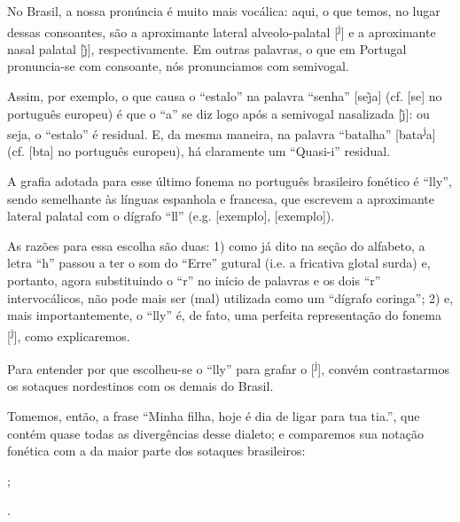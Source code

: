 \documentclass[12pt, a5paper, titlepage]{article}
\begin{document}
\begin{bilingualpages}
    No Brasil, a nossa pronúncia é muito mais vocálica: aqui, o que temos, no lugar dessas consoantes, são a aproximante lateral alveolo-palatal [\textsuperscript{j}] e a aproximante nasal palatal [\~\j], respectivamente. Em outras palavras, o que em Portugal pronuncia-se com consoante, nós pronunciamos com semivogal.

    Assim, por exemplo, o que causa o ``estalo'' na palavra ``senha'' [\textprimstress se\~\j a] (cf. [\textprimstress se\textltailn\textturna] no português europeu) é que o ``a'' se diz logo após a semivogal nasalizada [\~\j]: ou seja, o ``estalo'' é residual. E, da mesma maneira, na palavra ``batalha'' [ba\textprimstress ta{\textsuperscript{j}}a] (cf. [b\textturna\textprimstress ta\textturny\textturna] no português europeu), há claramente um ``Quasi-i'' residual.

    A grafia adotada para esse último fonema no português brasileiro fonético é ``lly'', sendo semelhante às línguas espanhola e francesa, que escrevem a aproximante lateral palatal com o dígrafo ``ll'' (e.g. [exemplo], [exemplo]).

    As razões para essa escolha são duas: 1) como já dito na seção do alfabeto, a letra ``h'' passou a ter o som do ``Erre'' gutural (i.e. a fricativa glotal surda) e, portanto, agora substituindo o ``r'' no início de palavras e os dois ``r'' intervocálicos, não pode mais ser (mal) utilizada como um ``dígrafo coringa''; 2) e, mais importantemente, o ``lly'' é, de fato, uma perfeita representação do fonema [\textsuperscript{j}], como explicaremos.

    Para entender por que escolheu-se o ``lly'' para grafar o [\textsuperscript{j}], convém contrastarmos os sotaques nordestinos com os demais do Brasil.

    Tomemos, então, a frase ``Minha filha, hoje é dia de ligar para tua tia.'', que contém quase todas as divergências desse dialeto; e comparemos sua notação fonética com a da maior parte dos sotaques brasileiros:
    \\
    \par[
        \textprimstress mĩa
        \textprimstress fi\textsubbar{l}\textsuperscript{j}a,
        \textprimstress\textopeno \textyogh i
        \textepsilon \
        \textprimstress dia
        di
        li\textprimstress gah
        \textprimstress pa\textfishhookr
        a
        \textprimstress tua
        \textprimstress tia.
    ];
    \par[
        \textprimstress mĩa
        \textprimstress fi\textsubbar{l}\textsuperscript{j}a,
        \textprimstress o\textyogh i
        \textepsilon \
        \textprimstress \texttoptiebar{d\textyogh}ia
        \texttoptiebar{d\textyogh}i
        \textsubbar{l}\textsuperscript{j}i\textprimstress gah
        \textprimstress pa\textfishhookr
        a
        \textprimstress tua
        \textprimstress \texttoptiebar{t\textesh}ia.
    ].
    \\


\end{bilingualpages}
\end{document}
